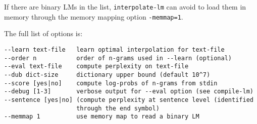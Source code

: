 \bigskip
\noindent
If there are binary LMs in the list,  {\tt interpolate-lm} can avoid to load them in memory through the memory 
mapping option {\tt -memmap=1}.


\noindent
The full list of options is:

\begin{verbatim}
--learn text-file   learn optimal interpolation for text-file
--order n           order of n-grams used in --learn (optional)
--eval text-file    compute perplexity on text-file
--dub dict-size     dictionary upper bound (default 10^7)
--score [yes|no]    compute log-probs of n-grams from stdin
--debug [1-3]       verbose output for --eval option (see compile-lm)
--sentence [yes|no] (compute perplexity at sentence level (identified
                    through the end symbol)
--memmap 1          use memory map to read a binary LM
\end{verbatim}
 

